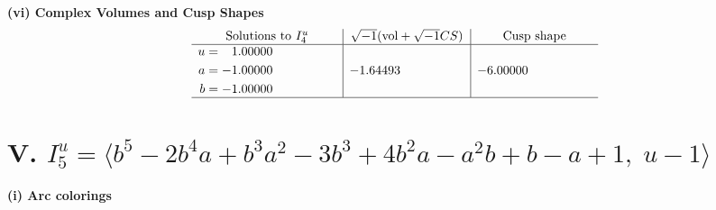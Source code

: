\documentclass[1p]{elsarticle_modified}
\theoremstyle{definition}
\newcommand{\I}{\sqrt{-1}}
\begin{document}
\newpage\flushleft \textbf{(vi) Complex Volumes and Cusp Shapes}
$$\begin{array}{c|c|c}  
\text{Solutions to }I^u_{4}& \I (\text{vol} + \sqrt{-1}CS) & \text{Cusp shape}\\
 \hline 
\begin{aligned}
u &= \phantom{-}1.00000\phantom{ +0.000000I} \\
a &= -1.00000\phantom{ +0.000000I} \\
b &= -1.00000\phantom{ +0.000000I}\end{aligned}
 & -1.64493\phantom{ +0.000000I} & -6.00000\phantom{ +0.000000I}\\
 \hline 
 \end{array}$$\newpage\newpage\renewcommand{\arraystretch}{1}
\centering \section*{V. $I^u_{5}= \langle b^5-2 b^4 a+b^3 a^2-3 b^3+4 b^2 a- a^2 b+b- a+1,\;u-1 \rangle$}
\flushleft \textbf{(i) Arc colorings}\\
\end{document}
